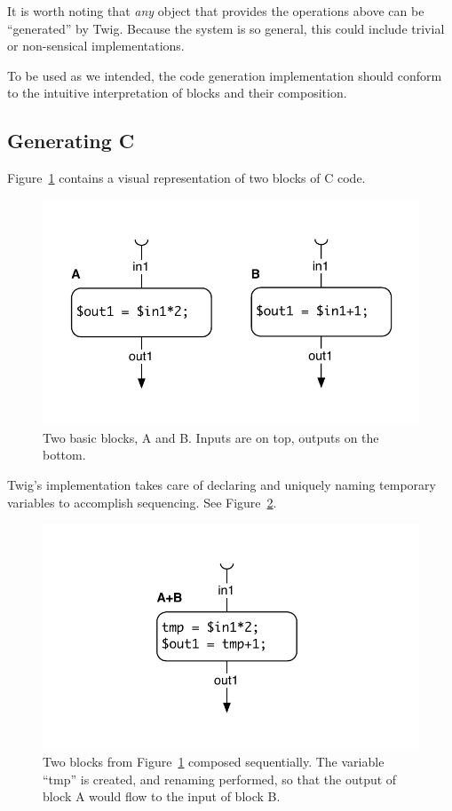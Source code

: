 It is worth noting that \emph{any} object that provides the operations above can be ``generated'' by Twig. Because the system is so general, this could include trivial or non-sensical  implementations.

To be used as we intended, the code generation implementation should conform to the intuitive interpretation of blocks and their composition.

\subsection{Generating C}
\label{sec:code-gen:c}

Figure~\ref{fig:blocks} contains a visual representation of two blocks of C code.

\begin{figure}[ht]
\centering
\includegraphics[width=0.75\columnwidth]{images/code-gen1}
\caption{Two basic blocks, A and B. Inputs are on top, outputs on the bottom.}
\label{fig:blocks}
\end{figure}

Twig's implementation takes care of declaring and uniquely naming temporary variables to accomplish sequencing. See Figure~\ref{fig:codegen-seq}.

\begin{figure}[ht]
\centering
\includegraphics[width=0.75\columnwidth]{images/code-gen2}
\caption{Two blocks from Figure~\ref{fig:blocks} composed sequentially. The variable ``tmp'' is created, and renaming performed, so that the output of block A would flow to the input of block B.}
\label{fig:codegen-seq}
\end{figure}


